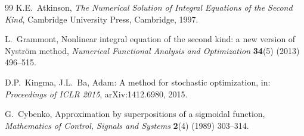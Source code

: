 \documentclass[12pt,a4paper]{article}
\begin{document}
\begin{thebibliography}{99}
K.E.~Atkinson,
\textit{The Numerical Solution of Integral Equations of
the Second Kind},
Cambridge University Press, Cambridge, 1997.

L.~Grammont,
Nonlinear integral equation of the second kind:
a new version of Nystr\"{o}m method,
\textit{Numerical Functional Analysis and Optimization}
\textbf{34}(5) (2013) 496--515.

D.P.~Kingma, J.L.~Ba,
Adam: A method for stochastic optimization,
in: \textit{Proceedings of ICLR 2015},
arXiv:1412.6980, 2015.

G.~Cybenko,
Approximation by superpositions of a sigmoidal function,
\textit{Mathematics of Control, Signals and Systems}
\textbf{2}(4) (1989) 303--314.

\end{thebibliography}
\end{document}
